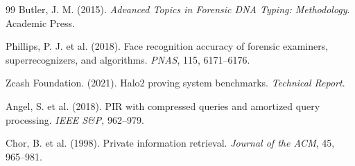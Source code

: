 \documentclass[11pt,letterpaper]{article}
\begin{document}
\begin{thebibliography}{99}
 Butler, J. M. (2015). \textit{Advanced Topics in Forensic DNA Typing: Methodology}. Academic Press.

 Phillips, P. J. et al. (2018). Face recognition accuracy of forensic examiners, superrecognizers, and algorithms. \textit{PNAS}, 115, 6171--6176.

 Zcash Foundation. (2021). Halo2 proving system benchmarks. \textit{Technical Report}.

 Angel, S. et al. (2018). PIR with compressed queries and amortized query processing. \textit{IEEE S\&P}, 962--979.

 Chor, B. et al. (1998). Private information retrieval. \textit{Journal of the ACM}, 45, 965--981.

\end{thebibliography}
\end{document}
